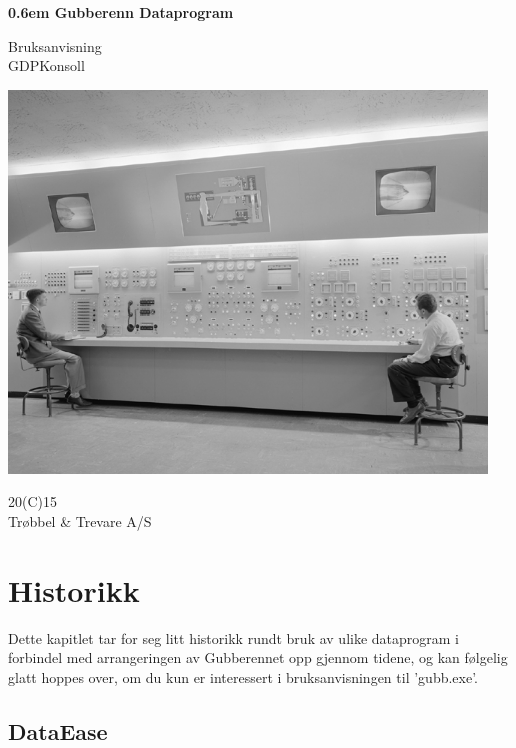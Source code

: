 \documentclass[12pt]{book}
\begin{document}
\clearpage

\newcommand\nbvspace[1][3]{\vspace*{\stretch{#1}}}
\newcommand\nbstretchyspace{\spaceskip0.5em plus 0.25em minus 0.25em}
\newcommand{\nbtitlestretch}{\spaceskip0.6em}
\pagestyle{empty}
\begin{center}
\bfseries
\nbvspace[1]
\Huge
{\nbtitlestretch\huge
Gubberenn Dataprogram \\}

\nbvspace[10]
\normalsize

Bruksanvisning\\
GDPKonsoll\\

\nbvspace[2]

\includegraphics[width=5.0in]{datacenter}
\nbvspace[15]
\normalsize

20(C)15\\
\large
Trøbbel \& Trevare A/S
\nbvspace[1]
\end{center}

\tableofcontents

\chapter{Historikk}

Dette kapitlet tar for seg litt historikk rundt bruk av ulike dataprogram i 
forbindel med arrangeringen av Gubberennet opp gjennom tidene, og kan følgelig 
glatt hoppes over, om du kun er interessert i bruksanvisningen til 'gubb.exe'. 

\section{DataEase}
\end{document}
